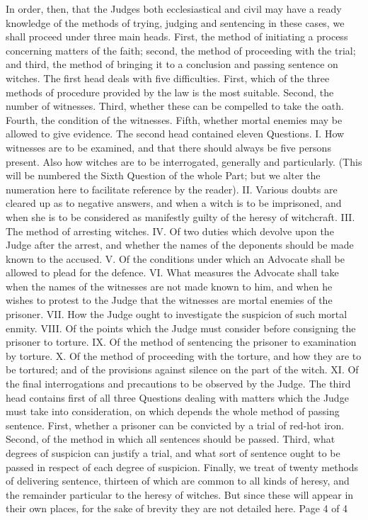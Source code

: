              In order, then, that the Judges both ecclesiastical and civil may have a ready knowledge
       of the methods of trying, judging and sentencing in these cases, we shall proceed under three
       main heads. First, the method of initiating a process concerning matters of the faith; second,
       the method of proceeding with the trial; and third, the method of bringing it to a conclusion
       and passing sentence on witches.
             The first head deals with five difficulties. First, which of the three methods of
       procedure provided by the law is the most suitable. Second, the number of witnesses. Third,
       whether these can be compelled to take the oath. Fourth, the condition of the witnesses.
       Fifth, whether mortal enemies may be allowed to give evidence.
             The second head contained eleven Questions. I. How witnesses are to be examined, and
       that there should always be five persons present. Also how witches are to be interrogated,
       generally and particularly. (This will be numbered the Sixth Question of the whole Part; but
       we alter the numeration here to facilitate reference by the reader). II. Various doubts are
       cleared up as to negative answers, and when a witch is to be imprisoned, and when she is to
       be considered as manifestly guilty of the heresy of witchcraft. III. The method of arresting
       witches. IV. Of two duties which devolve upon the Judge after the arrest, and whether the
       names of the deponents should be made known to the accused. V. Of the conditions under
       which an Advocate shall be allowed to plead for the defence. VI. What measures the
       Advocate shall take when the names of the witnesses are not made known to him, and when
       he wishes to protest to the Judge that the witnesses are mortal enemies of the prisoner. VII.
       How the Judge ought to investigate the suspicion of such mortal enmity. VIII. Of the points
       which the Judge must consider before consigning the prisoner to torture. IX. Of the method
       of sentencing the prisoner to examination by torture. X. Of the method of proceeding with
       the torture, and how they are to be tortured; and of the provisions against silence on the part
       of the witch. XI. Of the final interrogations and precautions to be observed by the Judge.
             The third head contains first of all three Questions dealing with matters which the
       Judge must take into consideration, on which depends the whole method of passing
       sentence. First, whether a prisoner can be convicted by a trial of red-hot iron. Second, of the
       method in which all sentences should be passed. Third, what degrees of suspicion can justify
       a trial, and what sort of sentence ought to be passed in respect of each degree of suspicion.
       Finally, we treat of twenty methods of delivering sentence, thirteen of which are common to
       all kinds of heresy, and the remainder particular to the heresy of witches. But since these
       will appear in their own places, for the sake of brevity they are not detailed here.
                                                                 Page 4 of 4


